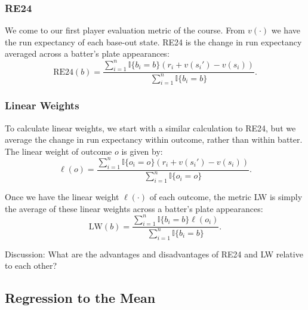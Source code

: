 \documentclass{article}
\begin{document}
      \subsubsection{\sc RE24}

        We come to our first player evaluation metric of the course. From $v(\cdot)$ we have the run expectancy of each base-out state. RE24 is the change in run expectancy averaged across a batter's plate appearances:
        \begin{equation*}
          \text{RE24}(b) = \frac{
            \sum_{i = 1}^n \mathbb{I}\{b_i = b\} (r_i + v(s_i') - v(s_i))
          }{
            \sum_{i = 1}^n \mathbb{I}\{b_i = b\}
          }.
        \end{equation*}

      \subsubsection{\sc Linear Weights}

        To calculate linear weights, we start with a similar calculation to RE24, but we average the change in run expectancy within outcome, rather than within batter. The linear weight of outcome $o$ is given by:
        \begin{equation*}
          \ell(o) = \frac{
            \sum_{i = 1}^n \mathbb{I}\{o_i = o\} (r_i + v(s_i') - v(s_i))
          }{
            \sum_{i = 1}^n \mathbb{I}\{o_i = o\}
          }.
        \end{equation*}

        Once we have the linear weight $\ell(\cdot)$ of each outcome, the metric LW is simply the average of these linear weights across a batter's plate appearances:
        \begin{equation*}
          \text{LW}(b) = \frac{
            \sum_{i = 1}^n \mathbb{I}\{b_i = b\} \ell(o_i)
          }{
            \sum_{i = 1}^n \mathbb{I}\{b_i = b\}
          }.
        \end{equation*}

        \begin{framed}
          {\sc Discussion:} What are the advantages and disadvantages of RE24 and LW relative to each other?
        \end{framed}
    
    \subsection{\sc Regression to the Mean}
\end{document}
